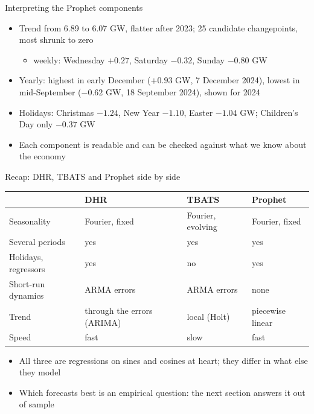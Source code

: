 \begin{frame}{Interpreting the Prophet components}
\itemsize{\small}
\begin{itemize}
    \item Trend from 6.89 to 6.07 GW, flatter after 2023; 25 candidate changepoints, most shrunk to zero
    \begin{itemize}
        \item weekly: Wednesday $+0.27$, Saturday $\ensuremath{-}0.32$, Sunday $\ensuremath{-}0.80$ GW
    \end{itemize}
    \item Yearly: highest in early December ($+0.93$ GW, 7 December 2024), lowest in mid-September ($\ensuremath{-}0.62$ GW, 18 September 2024), shown for 2024
    \item Holidays: Christmas $\ensuremath{-}1.24$, New Year $\ensuremath{-}1.10$, Easter $\ensuremath{-}1.04$ GW; Children's Day only $\ensuremath{-}0.37$ GW
    \item Each component is readable and can be checked against what we know about the economy
\end{itemize}
\end{frame}

\begin{frame}{Recap: DHR, TBATS and Prophet side by side}
\itemsize{\footnotesize}
\begin{center}
\scriptsize
\begin{tabular}{>{\raggedright\arraybackslash}p{2.6cm}>{\raggedright\arraybackslash}p{2.8cm}>{\raggedright\arraybackslash}p{2.8cm}>{\raggedright\arraybackslash}p{2.8cm}}
\toprule
 & \textbf{DHR} & \textbf{TBATS} & \textbf{Prophet} \\
\midrule
Seasonality & Fourier, fixed & Fourier, evolving & Fourier, fixed \\
Several periods & yes & yes & yes \\
Holidays, regressors & yes & no & yes \\
Short-run dynamics & ARMA errors & ARMA errors & none \\
Trend & through the errors (ARIMA) & local (Holt) & piecewise linear \\
Speed & fast & slow & fast \\
\bottomrule
\end{tabular}
\end{center}
\begin{itemize}
    \item All three are regressions on sines and cosines at heart; they differ in what else they model
    \item Which forecasts best is an empirical question: the next section answers it out of sample
\end{itemize}
\end{frame}


